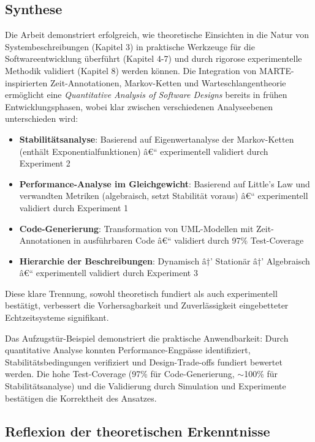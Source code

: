 ﻿\documentclass[a4paper,12pt]{report}
\theoremstyle{definition}
\begin{document}
\subsection{Synthese}

Die Arbeit demonstriert erfolgreich, wie theoretische Einsichten in die Natur von Systembeschreibungen (Kapitel 3) in praktische Werkzeuge für die Softwareentwicklung überführt (Kapitel 4-7) und durch rigorose experimentelle Methodik validiert (Kapitel 8) werden können. Die Integration von MARTE-inspirierten Zeit-Annotationen, Markov-Ketten und Warteschlangentheorie ermöglicht eine \textit{Quantitative Analysis of Software Designs} bereits in frühen Entwicklungsphasen, wobei klar zwischen verschiedenen Analyseebenen unterschieden wird:

\begin{itemize}
	\item[-] \textbf{Stabilitätsanalyse}: Basierend auf Eigenwertanalyse der Markov-Ketten (enthält Exponentialfunktionen) â€“ experimentell validiert durch Experiment 2
	\item[-] \textbf{Performance-Analyse im Gleichgewicht}: Basierend auf Little's Law und verwandten Metriken (algebraisch, setzt Stabilität voraus) â€“ experimentell validiert durch Experiment 1
	\item[-] \textbf{Code-Generierung}: Transformation von UML-Modellen mit Zeit-Annotationen in ausführbaren Code â€“ validiert durch 97\% Test-Coverage
	\item[-] \textbf{Hierarchie der Beschreibungen}: Dynamisch â†’ Stationär â†’ Algebraisch â€“ experimentell validiert durch Experiment 3
\end{itemize}

Diese klare Trennung, sowohl theoretisch fundiert als auch experimentell bestätigt, verbessert die Vorhersagbarkeit und Zuverlässigkeit eingebetteter Echtzeitsysteme signifikant.

Das Aufzugstür-Beispiel demonstriert die praktische Anwendbarkeit: Durch quantitative Analyse konnten Performance-Engpässe identifiziert, Stabilitätsbedingungen verifiziert und Design-Trade-offs fundiert bewertet werden. Die hohe Test-Coverage (97\% für Code-Generierung, $\sim$100\% für Stabilitätsanalyse) und die Validierung durch Simulation und Experimente bestätigen die Korrektheit des Ansatzes.

\subsection{Reflexion der theoretischen Erkenntnisse}
\end{document}
